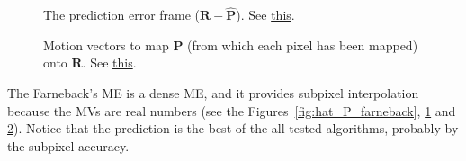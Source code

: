 \begin{figure}
  \centering
  \caption{The prediction error frame (${\mathbf R} - {\hat{\mathbf P}}$). See \href{https://github.com/Sistemas-Multimedia/Sistemas-Multimedia.github.io/blob/master/milestones/09-ME/farneback_ME.ipynb}{this}.}
  \label{fig:error_farneback}
\end{figure}

\begin{figure}
  \centering
  \caption{Motion vectors to map ${\mathbf P}$ (from which each pixel has been mapped) onto ${\mathbf R}$. See \href{https://github.com/Sistemas-Multimedia/Sistemas-Multimedia.github.io/blob/master/milestones/09-ME/farneback_ME.ipynb}{this}.}
  \label{fig:MVs_farneback}
\end{figure}

The Farneback's ME is a dense ME, and it provides subpixel
interpolation because the MVs are real numbers (see the
Figures~\ref{fig:hat_P_farneback}, \ref{fig:error_farneback} and
\ref{fig:MVs_farneback}). Notice that the prediction is the best of
the all tested algorithms, probably by the subpixel accuracy.
